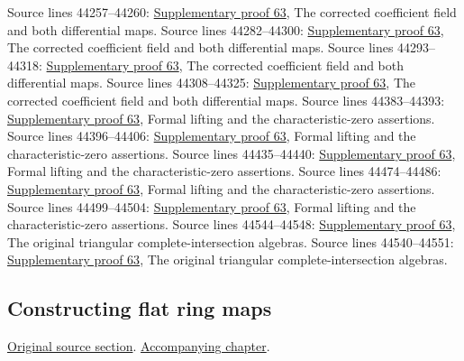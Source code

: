 \begin{AlgebraSourceRoutes}
 Source lines 44257--44260: \hyperlink{algebra_field_formal_smooth_notes_20260929}{Supplementary proof 63}, The corrected coefficient field and both differential maps.
 Source lines 44282--44300: \hyperlink{algebra_field_formal_smooth_notes_20260929}{Supplementary proof 63}, The corrected coefficient field and both differential maps.
 Source lines 44293--44318: \hyperlink{algebra_field_formal_smooth_notes_20260929}{Supplementary proof 63}, The corrected coefficient field and both differential maps.
 Source lines 44308--44325: \hyperlink{algebra_field_formal_smooth_notes_20260929}{Supplementary proof 63}, The corrected coefficient field and both differential maps.
 Source lines 44383--44393: \hyperlink{algebra_field_formal_smooth_notes_20260929}{Supplementary proof 63}, Formal lifting and the characteristic-zero assertions.
 Source lines 44396--44406: \hyperlink{algebra_field_formal_smooth_notes_20260929}{Supplementary proof 63}, Formal lifting and the characteristic-zero assertions.
 Source lines 44435--44440: \hyperlink{algebra_field_formal_smooth_notes_20260929}{Supplementary proof 63}, Formal lifting and the characteristic-zero assertions.
 Source lines 44474--44486: \hyperlink{algebra_field_formal_smooth_notes_20260929}{Supplementary proof 63}, Formal lifting and the characteristic-zero assertions.
 Source lines 44499--44504: \hyperlink{algebra_field_formal_smooth_notes_20260929}{Supplementary proof 63}, Formal lifting and the characteristic-zero assertions.
 Source lines 44544--44548: \hyperlink{algebra_field_formal_smooth_notes_20260929}{Supplementary proof 63}, The original triangular complete-intersection algebras.
 Source lines 44540--44551: \hyperlink{algebra_field_formal_smooth_notes_20260929}{Supplementary proof 63}, The original triangular complete-intersection algebras.
\end{AlgebraSourceRoutes}

\subsection{Constructing flat ring maps}
\hypertarget{algebra-source-section-constructing-flat}{}
\noindent\href{https://github.com/stacks/stacks-project/blob/a04446e57ec1fbc252a871afcec7752fb2807b14/algebra.tex\#L44566}{Original source section}. \href{algebra.pdf\#nameddest=section-constructing-flat}{Accompanying chapter}.

